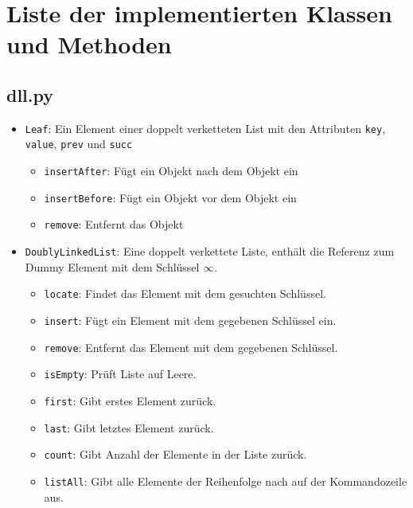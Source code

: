 \chapter{Liste der implementierten Klassen und Methoden}
\label{appendix:classes}
\section{dll.py}

\begin{itemize}

    \item \texttt{Leaf}: Ein Element einer doppelt verketteten List mit den Attributen \texttt{key}, \texttt{value}, \texttt{prev} und \texttt{succ}

    \begin{itemize}
        \item \texttt{insertAfter}: Fügt ein Objekt nach dem Objekt ein
        \item \texttt{insertBefore}: Fügt ein Objekt vor dem Objekt ein
        \item \texttt{remove}: Entfernt das Objekt
    \end{itemize}

    \item \texttt{DoublyLinkedList}: Eine doppelt verkettete Liste, enthält die Referenz zum Dummy Element mit dem Schlüssel $\infty$.

    \begin{itemize}
        \item \texttt{locate}: Findet das Element mit dem gesuchten Schlüssel.
        \item \texttt{insert}: Fügt ein Element mit dem gegebenen Schlüssel ein.
        \item \texttt{remove}: Entfernt das Element mit dem gegebenen Schlüssel.
        \item \texttt{isEmpty}: Prüft Liste auf Leere.
        \item \texttt{first}: Gibt erstes Element zurück.
        \item \texttt{last}: Gibt letztes Element zurück.
        \item \texttt{count}: Gibt Anzahl der Elemente in der Liste zurück.
        \item \texttt{listAll}: Gibt alle Elemente der Reihenfolge nach auf der Kommandozeile aus.
    \end{itemize}

\end{itemize}

